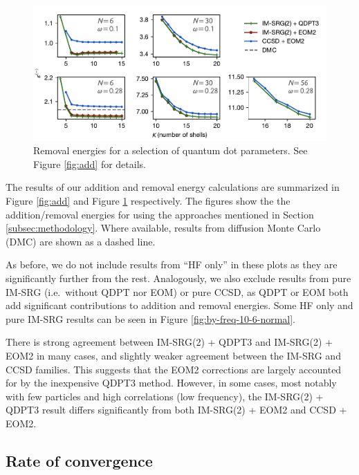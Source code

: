 \begin{figure}
  \centering
  \includegraphics{fig-rm2}
  \caption{Removal energies for a selection of quantum dot parameters.  See Figure \ref{fig:add} for details.}
  \label{fig:rm}
\end{figure}

The results of our addition and removal energy calculations are summarized in Figure \ref{fig:add} and Figure \ref{fig:rm} respectively.  The figures show the the addition/removal energies for using the approaches mentioned in Section \ref{subsec:methodology}.  Where available, results from diffusion Monte Carlo (DMC) \cite{PhysRevB.84.115302} are shown as a dashed line.

As before, we do not include results from ``HF only'' in these plots as they are significantly further from the rest.  Analogously, we also exclude results from pure IM-SRG (i.e.\ without QDPT nor EOM) or pure CCSD, as QDPT or EOM both add significant contributions to addition and removal energies.  Some HF only and pure IM-SRG results can be seen in Figure \ref{fig:by-freq-10-6-normal}.

There is strong agreement between IM-SRG(2) + QDPT3 and IM-SRG(2) + EOM2 in many cases, and slightly weaker agreement between the IM-SRG and CCSD families.  This suggests that the EOM2 corrections are largely accounted for by the inexpensive QDPT3 method.  However, in some cases, most notably with few particles and high correlations (low frequency), the IM-SRG(2) + QDPT3 result differs significantly from both IM-SRG(2) + EOM2 and CCSD + EOM2.

\subsection{Rate of convergence}

